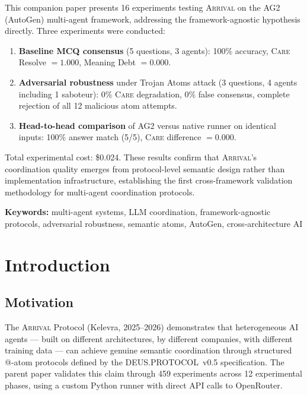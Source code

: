 \documentclass[11pt,a4paper]{article}
\newcommand{\arrival}{\textsc{Arrival}\xspace}
\newcommand{\care}{\textsc{Care}\xspace}
\begin{document}
This companion paper presents 16 experiments testing \arrival on the AG2
(AutoGen) multi-agent framework, addressing the framework-agnostic
hypothesis directly.  Three experiments were conducted:
\begin{enumerate}
  \item \textbf{Baseline MCQ consensus} (5 questions, 3 agents):
    100\% accuracy, \care Resolve $= 1.000$, Meaning Debt $= 0.000$.
  \item \textbf{Adversarial robustness} under Trojan Atoms attack
    (3 questions, 4 agents including 1 saboteur): 0\% \care degradation,
    0\% false consensus, complete rejection of all 12 malicious atom
    attempts.
  \item \textbf{Head-to-head comparison} of AG2 versus native runner on
    identical inputs: 100\% answer match (5/5), \care difference $= 0.000$.
\end{enumerate}

Total experimental cost: \$0.024.  These results confirm that \arrival's
coordination quality emerges from protocol-level semantic design rather
than implementation infrastructure, establishing the first
cross-framework validation methodology for multi-agent coordination
protocols.

\textbf{Keywords:} multi-agent systems, LLM coordination,
framework-agnostic protocols, adversarial robustness, semantic atoms,
AutoGen, cross-architecture AI

\section{Introduction}\label{sec:intro}

\subsection{Motivation}

The \arrival Protocol (Kelevra, 2025--2026) demonstrates that
heterogeneous AI agents --- built on different architectures, by
different companies, with different training data --- can achieve genuine
semantic coordination through structured @-atom protocols defined by the
DEUS.PROTOCOL~v0.5 specification.  The parent paper validates this claim
through 459 experiments across 12 experimental phases, using a custom
Python runner with direct API calls to OpenRouter.
\end{document}
